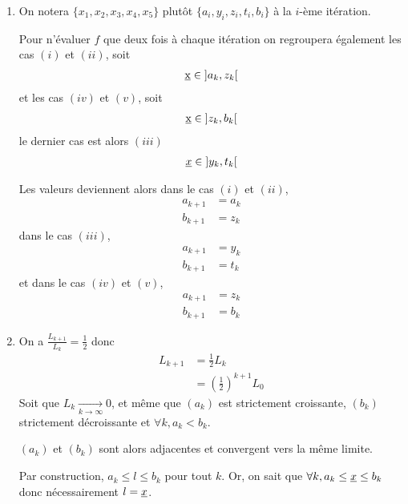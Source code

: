 \documentclass[french,a4paper,10pt]{article}
\begin{document}
	\begin{td-sol}
		\begin{enumerate}
			\item On notera $\{x_1, x_2, x_3, x_4, x_5\}$ plutôt $\{a_i, y_i, z_i, t_i, b_i\}$ à la $i$-ème itération. 
				
				Pour n'évaluer $f$ que deux fois à chaque itération on regroupera également les cas $(i)$ et $(ii)$, soit
				\[\begin{aligned}
					\underbar x \in\mathopen{]}a_k, z_k\mathclose{[}
				\end{aligned}\]
				et les cas $(iv)$ et $(v)$, soit
				\[\begin{aligned}
					\underbar x\in\mathopen{]}z_k,b_k\mathclose{[}
				\end{aligned}\]
				le dernier cas est alors $(iii)$
				\[\begin{aligned}
					\underline{x}\in\mathopen{]}y_k,t_k\mathclose{[}
				\end{aligned}\]
				
				Les valeurs deviennent alors dans le cas $(i)$ et $(ii)$,
				\[\begin{aligned}
					a_{k+1}&=a_k\\
					b_{k+1}&=z_k
				\end{aligned}\]
				dans le cas $(iii)$,
				\[\begin{aligned}
					a_{k+1}&=y_k\\
					b_{k+1}&=t_k
				\end{aligned}\]
				et dans le cas $(iv)$ et $(v)$,
				\[\begin{aligned}
					a_{k+1}&=z_k\\
					b_{k+1}&= b_k
				\end{aligned}\]
			
			\item On a $\frac{L_{k+1}}{L_k}=\frac12$ donc
				\[\begin{aligned}
					L_{k+1}&=\frac12L_k\\
					&=\left(\frac12\right)^{k+1}L_0
				\end{aligned}\]
			Soit que $L_k\underset{k\to\infty}\to 0$, et même que $(a_k)$ est strictement croissante, $(b_k)$ strictement décroissante et $\forall k,a_k<b_k$.
			
			$(a_k)$ et $(b_k)$ sont alors adjacentes et convergent vers la même limite.
			
			Par construction, $a_k\le l\le b_k$ pour tout $k$. Or, on sait que $\forall k,a_k\le \underline{x}\le b_k$ donc nécessairement $l=\underline{x}$.
		\end{enumerate}
	\end{td-sol}
	\medspace
	
\end{document}
